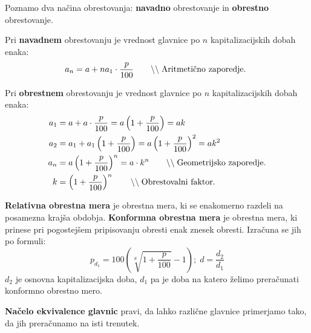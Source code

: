 \documentclass[a4paper,oneside,12pt,fleqn]{article}
\newcommand\krat\cdot
\newcommand{\comment}[1]{\ensuremath{\qquad\backslash\backslash\;}\textnormal{#1}}
\numberwithin{equation}{section}
\begin{document}
Poznamo dva načina obrestovanja: \textbf{navadno} obrestovanje in \textbf{obrestno} obrestovanje.

Pri \textbf{navadnem} obrestovanju je vrednost glavnice po $n$ kapitalizacijskih dobah enaka:
\[ a_n = a + na_1\krat \frac{p}{100} \comment{Aritmetično zaporedje. } \]

Pri \textbf{obrestnem} obrestovanju je vrednost glavnice po $n$ kapitalizacijskih dobah enaka:
\begin{align*}
  a_1 &= a + a\krat \frac{p}{100} = a\left(1 + \frac{p}{100}\right) = ak \\
  a_2 &= a_1 + a_1\left( 1+\frac{p}{100} \right) = a\left(1+\frac{p}{100}\right)^2 = ak^2  \\
  a_n &= a\left( 1+\frac{p}{100} \right)^n = a\krat k^n \comment{Geometrijsko zaporedje.} \\
  k &= \left( 1+\frac{p}{100} \right)^n \comment{Obrestovalni faktor.}
\end{align*}

\textbf{Relativna obrestna mera} je obrestna mera, ki se enakomerno razdeli na posamezna
krajša obdobja.
\textbf{Konformna obrestna mera} je obrestna mera, ki prinese pri pogostejšem pripisovanju
obresti enak znesek obresti. Izračuna se jih po formuli:
\[ p_{d_1} = 100\left( \sqrt[d]{1+\frac{p}{100}} - 1 \right) ; \; d = \frac{d_2}{d_1} \]
$d_2$ je osnovna kapitalizacijska doba, $d_1$ pa je doba na katero želimo preračunati
konformno obrestno mero. 

\textbf{Načelo ekvivalence glavnic} pravi, da lahko različne glavnice primerjamo tako, da
jih preračunamo na isti trenutek.
\end{document}
